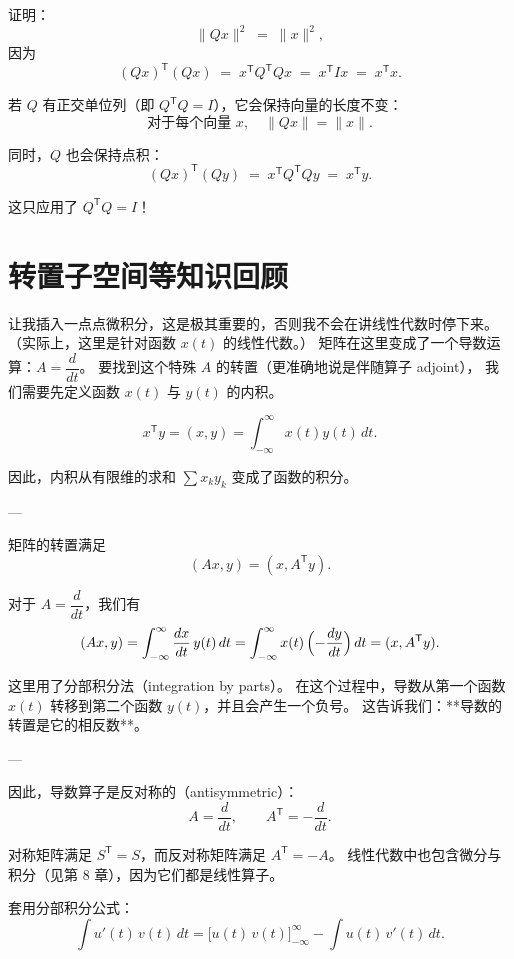 证明：  
\[
\lVert Qx \rVert^2 \;=\; \lVert x \rVert^2 ,
\]
因为
\[
(Qx)^{\mathsf T}(Qx) \;=\; x^{\mathsf T} Q^{\mathsf T} Q x \;=\; x^{\mathsf T} I x \;=\; x^{\mathsf T}x .
\]

\begin{theorem}[正交矩阵保持长度与内积]
若 $Q$ 有正交单位列（即 $Q^{\mathsf T}Q = I$），它会保持向量的长度不变：  
\[
\text{对于每个向量 } x, \quad \lVert Qx \rVert = \lVert x \rVert. \tag{3}
\]

同时，$Q$ 也会保持点积：
\[
(Qx)^{\mathsf T}(Qy) \;=\; x^{\mathsf T} Q^{\mathsf T} Q y \;=\; x^{\mathsf T} y .
\]

这只应用了 $Q^{\mathsf T}Q = I$！
\end{theorem}
\section{转置子空间等知识回顾}
\begin{theorem}[微积分与转置]
    让我插入一点点微积分，这是极其重要的，否则我不会在讲线性代数时停下来。
（实际上，这里是针对函数 $x(t)$ 的线性代数。）
矩阵在这里变成了一个导数运算：$A = \dfrac{d}{dt}$。
要找到这个特殊 $A$ 的转置（更准确地说是伴随算子 adjoint），
我们需要先定义函数 $x(t)$ 与 $y(t)$ 的内积。

\[
x^{\mathsf T}y = (x,y) = \int_{-\infty}^{\infty} x(t) y(t)\, dt.
\]

因此，内积从有限维的求和 $\sum x_k y_k$ 变成了函数的积分。

---

矩阵的转置满足
\[
(Ax,y) = (x,A^{\mathsf T}y).
\]

对于 $A = \dfrac{d}{dt}$，我们有
\[
(Ax,y) = \int_{-\infty}^{\infty} \frac{dx}{dt}\, y(t)\, dt
= \int_{-\infty}^{\infty} x(t)\,\Bigl(-\frac{dy}{dt}\Bigr)\, dt
= (x, A^{\mathsf T}y).
\]

这里用了分部积分法（integration by parts）。  
在这个过程中，导数从第一个函数 $x(t)$ 转移到第二个函数 $y(t)$，并且会产生一个负号。  
这告诉我们：**导数的转置是它的相反数**。

---

因此，导数算子是反对称的（antisymmetric）：
\[
A = \frac{d}{dt}, \qquad A^{\mathsf T} = -\frac{d}{dt}.
\]

对称矩阵满足 $S^{\mathsf T} = S$，而反对称矩阵满足 $A^{\mathsf T} = -A$。  
线性代数中也包含微分与积分（见第 8 章），因为它们都是线性算子。
\end{theorem}
套用分部积分公式：
\[
\int u'(t)\,v(t)\,dt
= \Big[u(t)\,v(t)\Big]_{-\infty}^{\infty} - \int u(t)\,v'(t)\,dt.
\]

